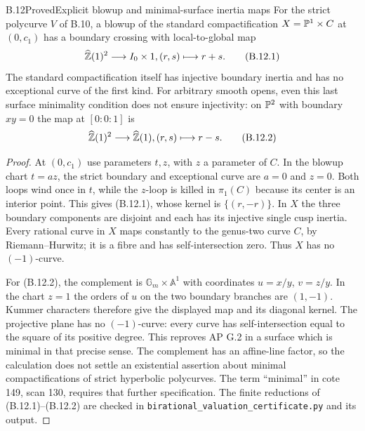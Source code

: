 \begin{statement}{B.12}{Proved}{Explicit blowup and minimal-surface inertia maps}
For the strict polycurve $V$ of B.10, a blowup of the standard
compactification $X=\mathbb P^1\times C$ at $(0,c_1)$ has a boundary
crossing with local-to-global map
\[
 \widehat{\mathbb Z}(1)^2\longrightarrow I_0\times1,
                 (r,s)\longmapsto r+s.            \tag{B.12.1}
\]
The standard compactification itself has injective boundary inertia
and has no exceptional curve of the first kind.  For arbitrary smooth
opens, even this last surface minimality condition does not ensure
injectivity: on $\mathbb P^2$ with boundary $xy=0$ the map at $[0:0:1]$ is
\[
 \widehat{\mathbb Z}(1)^2\longrightarrow\widehat{\mathbb Z}(1),
                    (r,s)\longmapsto r-s.         \tag{B.12.2}
\]
\end{statement}
\begin{proof}
At $(0,c_1)$ use parameters $t,z$, with $z$ a parameter of $C$.
In the blowup chart $t=az$, the strict boundary and exceptional
curve are $a=0$ and $z=0$.  Both loops wind once in $t$, while
the $z$-loop is killed in $\pi_1(C)$ because its center is an
interior point.  This gives (B.12.1), whose kernel is
$\{(r,-r)\}$.  In $X$ the three boundary components are disjoint
and each has its injective single cusp inertia.  Every rational
curve in $X$ maps constantly to the genus-two curve $C$, by
Riemann--Hurwitz; it is a fibre and has self-intersection zero.
Thus $X$ has no $(-1)$-curve.

For (B.12.2), the complement is $\mathbb G_m\times\mathbb A^1$
with coordinates $u=x/y$, $v=z/y$.  In the chart $z=1$ the
orders of $u$ on the two boundary branches are $(1,-1)$.
Kummer characters therefore give the displayed map and its diagonal
kernel.  The projective plane has no $(-1)$-curve: every curve has
self-intersection equal to the square of its positive degree.
This reproves AP G.2 in a surface which is minimal in that precise
sense.  The complement has an affine-line factor, so the calculation
does not settle an existential assertion about minimal
compactifications of strict hyperbolic polycurves.  The term
``minimal'' in cote 149, scan 130, requires that further specification.
The finite reductions of (B.12.1)--(B.12.2) are checked in
\texttt{birational\_valuation\_certificate.py} and its output.
\end{proof}

